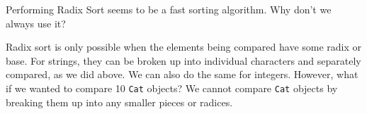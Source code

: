 \begin{blocksection}
\question Performing Radix Sort seems to be a fast sorting algorithm. Why don't
we always use it?

\begin{solution}[1in]
Radix sort is only possible when the elements being compared have some radix or
base. For strings, they can be broken up into individual characters and
separately compared, as we did above. We can also do the same for integers.
However, what if we wanted to compare 10 \lstinline$Cat$ objects? We cannot
compare \lstinline$Cat$ objects by breaking them up into any smaller pieces or
radices.
\end{solution}
\end{blocksection}
